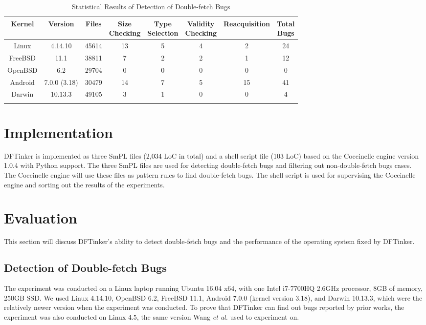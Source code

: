 \documentclass[10pt]{llncs}
\begin{document}
\begin{table}[t]
  \centering
  \caption{Statistical Results of Detection of Double-fetch Bugs}
  \begin{tabular}{cccccccc}
    \hline
    Kernel & Version & Files & \makecell{Size \\ Checking} & \makecell{Type \\ Selection} & \makecell{Validity \\ Checking} & Reacquisition & \makecell{Total \\ Bugs}\\    
    \hline
    Linux & 4.14.10 & 45614 & 13 & 5 & 4 & 2 & 24 \\
    FreeBSD & 11.1 & 38811 & 7 & 2 & 2 & 1 & 12 \\
    OpenBSD & 6.2 & 29704 & 0 & 0 & 0 & 0 & 0 \\
    Android & 7.0.0 (3.18) & 30479 & 14 & 7 & 5 & 15 & 41 \\
    Darwin & 10.13.3 & 49105 & 3 & 1 & 0 & 0 & 4 \\
    \hline
    \label{stat}
  \end{tabular}
\end{table}




\section{Implementation}%
\label{imple}

DFTinker is implemented as three SmPL files (2,034 LoC in total) and a shell script file (103 LoC) based on the Coccinelle engine version 1.0.4 with Python support. The three SmPL files are used for detecting double-fetch bugs and filtering out non-double-fetch bugs cases. The Coccinelle engine will use these files as pattern rules to find double-fetch bugs. The shell script is used for supervising the Coccinelle engine and sorting out the results of the experiments.


\section{Evaluation}%
\label{evalue}
This section will discuss DFTinker's ability to detect double-fetch bugs and the performance of the operating system fixed by DFTinker.


\subsection{Detection of Double-fetch Bugs}
\label{evalue1}
The experiment was conducted on a Linux laptop running Ubuntu 16.04 x64, with one Intel i7-7700HQ 2.6GHz processor, 8GB of memory, 250GB SSD. We used Linux 4.14.10, OpenBSD 6.2, FreeBSD 11.1, Android 7.0.0 (kernel version 3.18), and Darwin 10.13.3, which were the relatively newer version when the experiment was conducted. To prove that DFTinker can find out bugs reported by prior works, the experiment was also conducted on Linux 4.5, the same version Wang \textit{et al.} used to experiment on.
\end{document}
